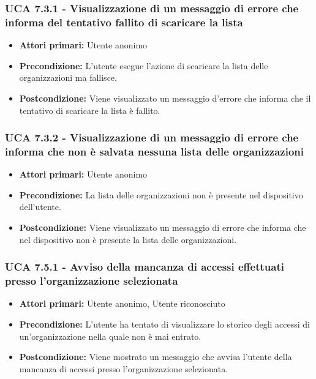 \subsubsection{UCA 7.3.1 - Visualizzazione di un messaggio di errore che informa del tentativo fallito di scaricare la lista}%
\begin{itemize}
\item \textbf{Attori primari:} Utente anonimo
\item \textbf{Precondizione:} L'utente esegue l'azione di scaricare la lista delle organizzazioni ma fallisce.
\item \textbf{Postcondizione:} Viene visualizzato un messaggio d'errore che informa che il tentativo di scaricare la lista è fallito.

\end{itemize}

\subsubsection{UCA 7.3.2 - Visualizzazione di un messaggio di errore che informa che non è salvata nessuna lista delle organizzazioni}%
\begin{itemize}
	\item \textbf{Attori primari:} Utente anonimo
	\item \textbf{Precondizione:} La lista delle organizzazioni non è presente nel dispositivo dell'utente.
	\item \textbf{Postcondizione:} Viene visualizzato un messaggio di errore che informa che nel dispositivo non è presente la lista delle organizzazioni.
\end{itemize}

\subsubsection{UCA 7.5.1 - Avviso della mancanza di accessi effettuati presso l'organizzazione selezionata}
\begin{itemize}
    \item \textbf{Attori primari:} Utente anonimo, Utente riconosciuto
    \item \textbf{Precondizione:} L'utente ha tentato di visualizzare lo storico degli accessi di un'organizzazione nella quale non è mai entrato.
    \item \textbf{Postcondizione:} Viene mostrato un messaggio che avvisa l'utente della mancanza di accessi presso l'organizzazione selezionata.
\end{itemize}

